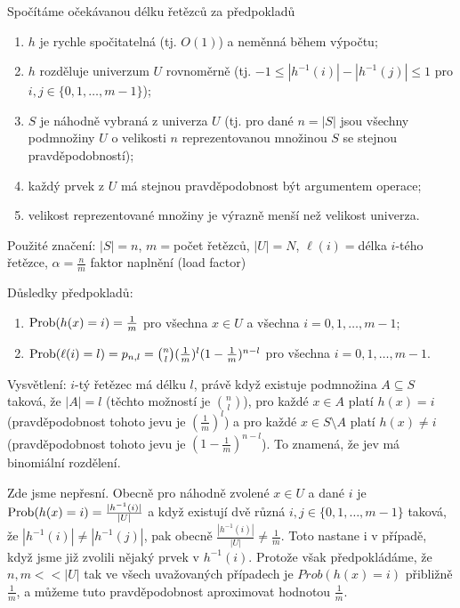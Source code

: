 \documentclass[a4paper,12pt]{article}
\begin{document}
Spočítáme očekávanou délku řetězců za 
předpokladů
\begin{enumerate}
\item
$h$ je rychle spočitatelná (tj. $O(1)$) a neměnná během 
výpočtu;
\item
$h$ rozděluje univerzum $U$ rovnoměrně (tj. 
$-1\le |h^{-1}(i)|-|h^{-1}(j)|\le 1$ pro $i,j\in \{0,1,\dots,m-1\}$);
\item
$S$ je náhodně vybraná z univerza $U$ (tj. pro dané $n=|
S|$ 
jsou všechny podmnoži\-ny $U$ o velikosti $n$ reprezentovanou 
množinou $S$ se stejnou pravděpodobností);\item
každý prvek z $U$ má stejnou pravděpodobnost být 
argumentem operace;
\item
velikost reprezentované množiny je výrazně menší než 
velikost univerza.
\end{enumerate}

Použité značení: $|S|=n$, $m=$počet 
řetězců, $|U|=N$,\newline 
$\ell (i)=$délka $i$-tého řetězce, $\alpha =\frac nm$ faktor naplnění (load factor)

Důsledky předpokladů:
\begin{enumerate}
\item 
$\operatorname{Prob}(h(x)=i)=\frac 1m$ pro všechna $x\in U$ a všechna 
$i=0,1,\dots,m-1$; 
\item 
$\operatorname{Prob}(\ell (i)=l)=p_{n,l}=\binom nl(\frac 1m)^l(1-\frac 1m)^{n-l}$ 
pro všechna $i=0,1,\dots,m-1$.
\end{enumerate}

Vysvětlení: $i$-tý řetězec má délku $
l$, právě když existuje 
pod\-mno\-žina $A\subseteq S$ taková, že $|A|=l$ (těchto možností je 
$\binom nl$), pro každé $x\in A$ platí $h(x)=i$ (pravděpodobnost 
tohoto jevu je $(\frac 1m)^l$) a pro každé $x\in S\setminus 
A$ platí $h(x)\ne i$ 
(pravděpodobnost tohoto jevu je $(1-\frac 1m)^{n-l}$). To znamená, že jev má 
binomiální rozdělení.

Zde jsme nepřesní. Obecně pro náhodně zvolené $
x\in U$ 
a dané $i$ je $\operatorname{Prob}(h(x)=i)=\frac {|h^{-1}(i)|}{|U|}$ a když existují dvě různá 
$i,j\in \{0,1,\dots,m-1\}$ taková, že $|h^{-1}(i)|\ne |h^{-1}
(j)|$, pak obecně 
$\frac {|h^{-1}(i)|}{|U|}\ne\frac 1m$. Toto nastane i v případě, když jsme již zvolili nějaký 
prvek v $h^{-1}(i)$. Protože však předpokládáme, že $
n,m<<|U|$ tak 
ve všech uvažovaných případech je $Prob(h(x)=i)$ přibližně 
$\frac 1m$, a můžeme tuto pravděpodobnost aproximovat 
hodnotou $\frac 1m$.
\end{document}

